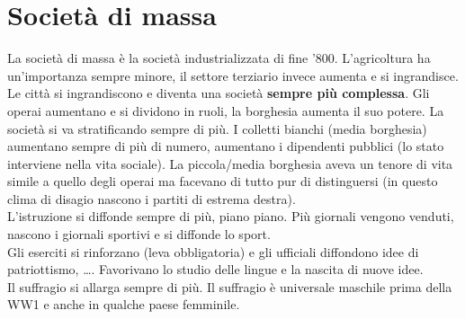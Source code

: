 
\section{Società di massa}
La società di massa è la società industrializzata di fine '800. L'agricoltura ha un'importanza sempre
minore, il settore terziario invece aumenta e si ingrandisce. Le città si ingrandiscono e diventa
una società \textbf{sempre più complessa}. Gli operai aumentano e si dividono in ruoli, la borghesia
aumenta il suo potere. La società si va stratificando sempre di più. I colletti bianchi (media 
borghesia) aumentano sempre di più di numero, aumentano i dipendenti pubblici (lo stato interviene
nella vita sociale). La piccola/media borghesia aveva un tenore di vita simile a quello degli operai
ma facevano di tutto pur di distinguersi (in questo clima di disagio nascono i partiti di estrema
destra).\\ [\baselineskip]
L'istruzione si diffonde sempre di più, piano piano. Più giornali vengono venduti, nascono i
giornali sportivi e si diffonde lo sport.\\ [\baselineskip]
Gli eserciti si rinforzano (leva obbligatoria) e gli ufficiali diffondono idee di patriottismo, 
\ldots. Favorivano lo studio delle lingue e la nascita di nuove idee.\\ [\baselineskip]
Il suffragio si allarga sempre di più. Il suffragio è universale maschile prima della WW1 e anche
in qualche paese femminile.

